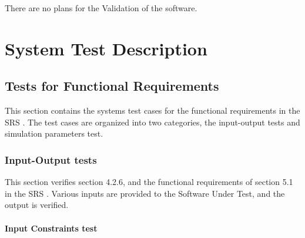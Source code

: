 \documentclass[12pt, titlepage]{article}
\begin{document}
There are no plans for the Validation of the \progname{} software.

\section{System Test Description} \label{sec_systems_tests}
	
\subsection{Tests for Functional Requirements}


This section contains the systems test cases for the functional requirements in the
SRS \cite{SRS}. The test cases are organized into two categories, the input-output 
tests and simulation parameters test.


\subsubsection{Input-Output tests}

  
This section verifies section 4.2.6, and the functional requirements of section 5.1
in the SRS \cite {SRS}. Various inputs are provided to the Software Under Test, 
and the output is verified. 
		
\paragraph{Input Constraints test}
\end{document}
